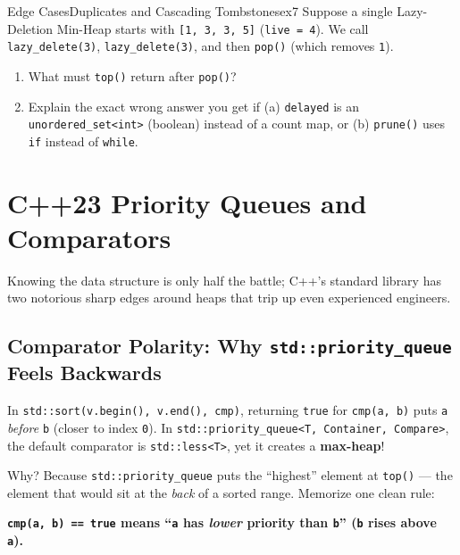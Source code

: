 \documentclass[11pt,a4paper]{article}
\theoremstyle{definition}
\begin{document}
\begin{tryitbox}{Edge Cases}{Duplicates and Cascading Tombstones}{ex7}
Suppose a single Lazy-Deletion Min-Heap starts with \texttt{[1, 3, 3, 5]} (\texttt{live = 4}). We call \texttt{lazy\_delete(3)}, \texttt{lazy\_delete(3)}, and then \texttt{pop()} (which removes \texttt{1}).
\begin{enumerate}[itemsep=1pt, topsep=2pt]
    \item What must \texttt{top()} return after \texttt{pop()}?
    \item Explain the exact wrong answer you get if (a) \texttt{delayed} is an \texttt{unordered\_set<int>} (boolean) instead of a count map, or (b) \texttt{prune()} uses \texttt{if} instead of \texttt{while}.
\end{enumerate}
\end{tryitbox}

\section{C++23 Priority Queues and Comparators}

Knowing the data structure is only half the battle; C++'s standard library has two notorious sharp edges around heaps that trip up even experienced engineers.

\subsection{Comparator Polarity: Why \texttt{std::priority\_queue} Feels Backwards}

In \texttt{std::sort(v.begin(), v.end(), cmp)}, returning \texttt{true} for \texttt{cmp(a, b)} puts \texttt{a} \emph{before} \texttt{b} (closer to index \texttt{0}). In \texttt{std::priority\_queue<T, Container, Compare>}, the default comparator is \texttt{std::less<T>}, yet it creates a \textbf{max-heap}!

Why? Because \texttt{std::priority\_queue} puts the ``highest'' element at \texttt{top()} --- the element that would sit at the \emph{back} of a sorted range. Memorize one clean rule:
\begin{center}
\textbf{\color{primaryblue}\texttt{cmp(a, b) == true} means ``\texttt{a} has \emph{lower} priority than \texttt{b}'' (\texttt{b} rises above \texttt{a}).}
\end{center}
\end{document}
